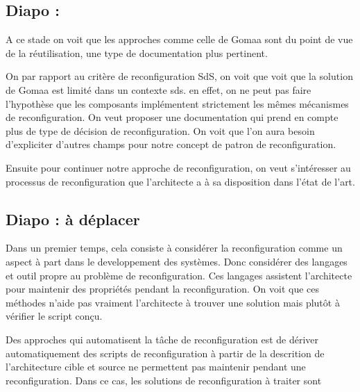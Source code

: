 \subsection{Diapo : }

A ce stade on voit que les approches comme celle de Gomaa sont du
point de vue de la réutilisation, une type de documentation plus
pertinent. 

On par rapport au critère de reconfiguration SdS, on voit que voit que
la solution de Gomaa est limité dans un contexte sds. en effet, on ne
peut pas faire l'hypothèse que les composants implémentent strictement
les mêmes mécanismes de reconfiguration. On veut proposer une
documentation qui prend en compte plus de type de décision de
reconfiguration. On voit que l'on aura besoin d'expliciter d'autres
champs pour notre concept de patron de reconfiguration.

Ensuite pour continuer notre approche de reconfiguration, on veut
s'intéresser au processus de reconfiguration que l'architecte a à sa
disposition dans l'état de l'art. 

\subsection{Diapo : à déplacer }

Dans un premier temps, cela consiste à considérer la reconfiguration
comme un aspect à part dans le developpement des systèmes. 
Donc considérer des langages et outil propre au
problème de reconfiguration. Ces langages assistent l'architecte pour
maintenir des propriétés pendant la reconfiguration. 
On voit que ces méthodes n'aide pas vraiment l'architecte à trouver
une solution mais plutôt à vérifier le script conçu. 

Des approches qui automatisent la tâche de reconfiguration est de
dériver automatiquement des scripts de reconfiguration à partir de la
descrition de l'architecture cible et source ne permettent pas 
maintenir pendant une reconfiguration. Dans ce cas, les solutions de
reconfiguration à traiter sont 
 
